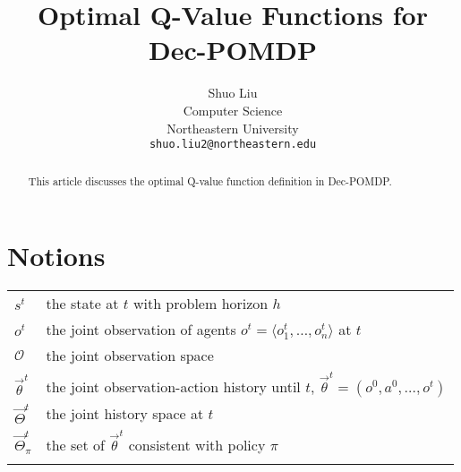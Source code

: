 \documentclass{article} %
\title{Optimal Q-Value Functions for Dec-POMDP}
\author{Shuo Liu \\
Computer Science\\
Northeastern University\\
\texttt{shuo.liu2@northeastern.edu} \\
}
\newcommand{\obshist}{\vec{\theta}}
\begin{document}
\maketitle

\begin{abstract}
This article discusses the optimal Q-value function definition in Dec-POMDP.
\end{abstract}

\section{Notions}

\renewcommand{\arraystretch}{1.5}
\begin{table}[h!]
    \begin{tabular}{ll}
    \hline \hline
        $s^t$ & the state at $t$ with problem horizon $h$\\
        $o^t$ & the joint observation of agents $o^t=\langle o_1^t, \dots, o_n^t \rangle$ at $t$\\
        $\mathcal{O}$ & the joint observation space\\
        $\obshist^t$ & the joint observation-action history until $t$, $\obshist^t=(o^0, a^0, \dots, o^t)$ \\
        $\vec{\Theta}^t$ & the joint history space at $t$\\
        $\vec{\Theta}^t_\pi$ & the set of $\obshist^t$ consistent with policy $\pi$\\
        \\
        

\end{tabular}
\end{table}
\end{document}

